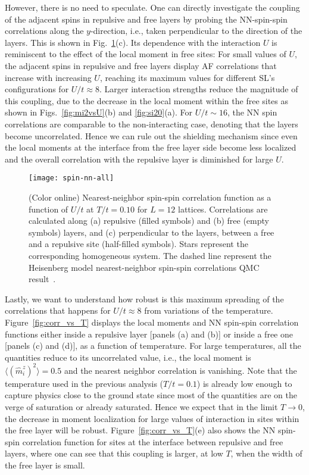 \documentclass[aps,pra,reprint,twocolumn,showpacs,longbibliography,superscriptaddress]{revtex4-1}
\begin{document}
However, there is no need to speculate. One can directly investigate the coupling of the adjacent spins in repulsive and free layers by probing the NN-spin-spin correlations along the $y$-direction, i.e., taken perpendicular to the direction of the layers. This is shown in Fig.~\ref{fig:nnspin}(c). Its dependence with the interaction $U$ is reminiscent to the effect of the local moment in free sites: For small values of $U$, the adjacent spins in repulsive and free layers display AF correlations that increase with increasing $U$,  reaching its maximum values for different SL's configurations for $U/t\approx8$. Larger interaction strengths reduce the magnitude of this coupling, due to the decrease in the local moment within the free sites as shown in Figs.~\ref{fig:mi2vsU}(b) and \ref{fig:si20}(a).
For $U/t\sim16$, the NN spin correlations are comparable to the non-interacting case,  denoting that the layers become uncorrelated. Hence we can rule out the shielding mechanism since even the local moments at the interface from the free layer side become less localized and the overall correlation with the repulsive layer is diminished for large $U$.

\begin{figure}[!tb] %
  \texttt{[image: spin-nn-all]}
 \caption{(Color online) Nearest-neighbor spin-spin correlation function as a function of $U/t$ at $T/t=0.10$ for $L=12$ lattices.  Correlations are calculated  along (a) repulsive (filled symbols) and (b) free (empty symbols) layers, and (c) perpendicular to the layers, between a free and a repulsive site (half-filled symbols).  
Stars represent the corresponding homogeneous system. The dashed line represent the Heisenberg model nearest-neighbor spin-spin correlations QMC result~\cite{sandvik}.}
 \label{fig:nnspin}
\end{figure}

Lastly, we want to understand how robust is this maximum spreading of the correlations that happens for $U/t\approx8$ from variations of the temperature. Figure~\ref{fig:corr_vs_T} displays the local moments and NN spin-spin correlation functions either inside a repulsive layer [panels (a) and (b)] or inside a free one [panels (c) and (d)], as a function of temperature. For large temperatures, all the quantities reduce to its uncorrelated value, i.e., the local moment is $\langle(\hat m_i^z)^2\rangle=0.5$ and the nearest neighbor correlation is vanishing. Note that the temperature used in the previous analysis ($T/t=0.1$) is already low enough to capture physics close to the ground state since most of the quantities are on the verge of saturation or already saturated. Hence we expect that in the limit $T\to0$, the decrease in moment localization for large values of interaction in sites within the free layer will be robust. Figure~\ref{fig:corr_vs_T}(e) also shows the NN spin-spin correlation function for sites at the interface between repulsive and free layers, where one can see that this coupling is larger, at low $T$, when the width of the free layer is small.
\end{document}

